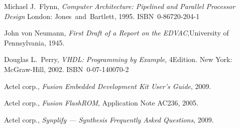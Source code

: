 \documentclass[12pt,a4paper]{article} %
\begin{document}
	
	
	
	\clearpage
	\raggedright
	\begin{thebibliography}{9}
			Michael J.~Flynn,
			\textit{Computer Architecture: Pipelined and Parallel Processor Design}
			\linebreak[3]
			London: Jones~and~Bartlett, 1995. ISBN~0-86720-204-1
		
			John von Neumann,
			\textit{First Draft of a Report on the EDVAC},\linebreak[2]
			University of Pennsylvania, 1945.
		
			Douglas L.~Perry,
			\textit{VHDL: Programming by Example}, 4\nth Edition. \linebreak[2]
			New York: McGraw-Hill, 2002. ISBN~0-07-140070-2
		
			Actel corp.,
			\textit{Fusion Embedded Development Kit User's Guide}, %
			2009.
		
			Actel corp.,
			\textit{Fusion FlashROM}, Application Note AC236, %
			2005.
		
			Actel corp.,
			\textit{Synplify — Synthesis Frequently Asked Questions}, %
			2009.
		
		
	\end{thebibliography}
	
\end{document}
